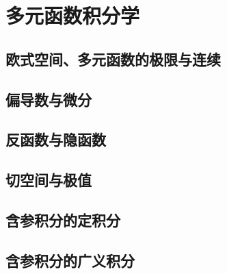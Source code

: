 \chapter{多元函数积分学}
\section{欧式空间、多元函数的极限与连续}

\section{偏导数与微分}

\section{反函数与隐函数}

\section{切空间与极值}

\section{含参积分的定积分}

\section{含参积分的广义积分}
